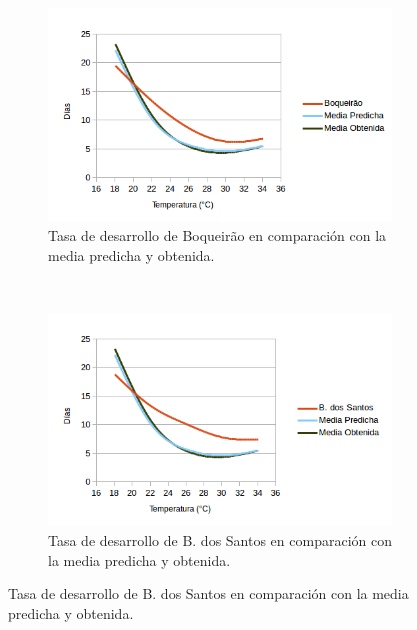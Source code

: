 \begin{figure}[!htbp]
    \centering
    \begin{subfigure}[b]{0.45\textwidth}
            \includegraphics[width=\textwidth]{capitulo-6/graphics/desarrollo-larva-1.png}
            \caption{Tasa de desarrollo de Boqueirão en comparación con la media predicha y obtenida.}
    \end{subfigure}
    ~~~~
    \begin{subfigure}[b]{0.45\textwidth}
            \includegraphics[width=\textwidth]{capitulo-6/graphics/desarrollo-larva-2.png}
            \caption{Tasa de desarrollo de B. dos Santos en comparación con la media predicha y obtenida.}


\end{subfigure}
\end{figure}
